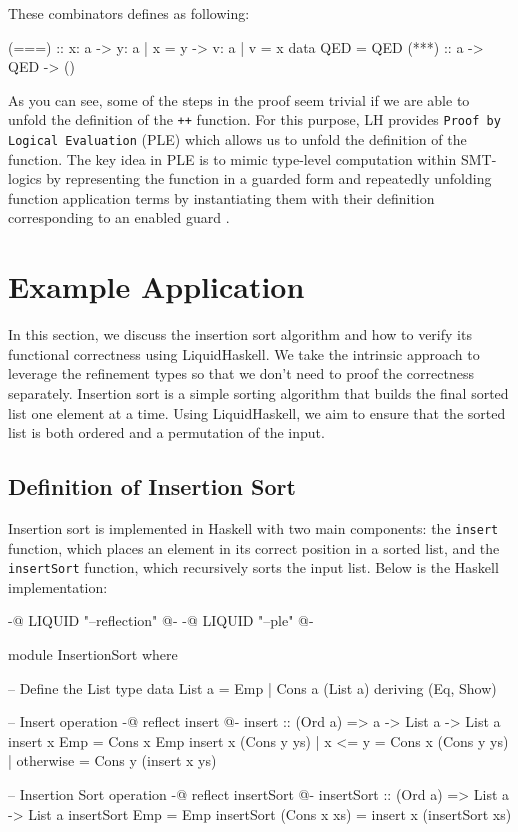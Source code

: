 \documentclass[]{rptuseminar}
\begin{document}
These combinators defines as following:
\begin{haskell}
  (===) :: x: a -> y: { a | x = y }  -> { v: a | v = x }
  data QED = QED
  (***) :: a -> QED -> ()
\end{haskell}

As you can see, some of the steps in the proof seem trivial if we are able to unfold the definition of the \texttt{++} function.
For this purpose, LH provides \texttt{Proof by Logical Evaluation} (PLE) which allows us to unfold the definition of the function.
The key idea in PLE is to mimic type-level computation within SMT-logics by representing the function in a guarded form and repeatedly unfolding function
application terms by instantiating them with their definition corresponding to an enabled guard \cite{vazou_refinement_2018}.

\section{Example Application}

In this section, we discuss the insertion sort algorithm and how to verify its functional correctness using LiquidHaskell.
We take the intrinsic approach to leverage the refinement types so that we don't need to proof the correctness separately.
Insertion sort is a simple sorting algorithm that builds the final sorted list one element at a time. 
Using LiquidHaskell, we aim to ensure that the sorted list is both ordered and a permutation of the input.

\subsection{Definition of Insertion Sort}

Insertion sort is implemented in Haskell with two main components: 
the \texttt{insert} function, which places an element in its correct position in a sorted list, 
and the \texttt{insertSort} function, which recursively sorts the input list. Below is the Haskell implementation:

\begin{haskell}
{-@ LIQUID "--reflection" @-}
{-@ LIQUID "--ple" @-}

module InsertionSort where

-- Define the List type
data List a = Emp | Cons a (List a) deriving (Eq, Show)

-- Insert operation
{-@ reflect insert @-}
insert :: (Ord a) => a -> List a -> List a
insert x Emp = Cons x Emp
insert x (Cons y ys)
  | x <= y    = Cons x (Cons y ys)
  | otherwise = Cons y (insert x ys)

-- Insertion Sort operation
{-@ reflect insertSort @-}
insertSort :: (Ord a) => List a -> List a
insertSort Emp = Emp
insertSort (Cons x xs) = insert x (insertSort xs)
\end{haskell}
\end{document}
